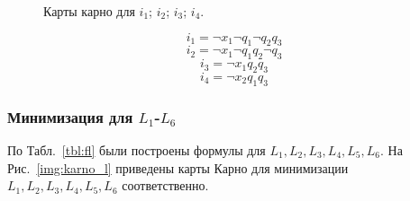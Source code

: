 \documentclass[a4paper, final]{article}
\begin{document}
\begin{figure}[H]
  \centering {}  
    \hspace{4ex}
    \hspace{4ex}
    \caption{Карты карно для  $i_1$;  $i_2$;  $i_3$;  $i_4$.
    }
    \label{img:karno_i}
  \end{figure}

\[i_1 = \neg x_1 \neg q_1 \neg q_2 q_3\]
\[i_2 = \neg x_1 \neg q_1 q_2 \neg q_3\]
\[i_3 = \neg x_1 q_2 q_3\]
\[i_4 = \neg x_2 q_1 q_3\]

\subsubsection{Минимизация для $L_1$-$L_6$}
По Табл.~\ref{tbl:fl} были построены формулы для $L_1, L_2, L_3, L_4, L_5, L_6$. На Рис.~\ref{img:karno_l} приведены карты Карно для минимизации $L_1, L_2, L_3, L_4, L_5, L_6$ соответственно.
\end{document}
